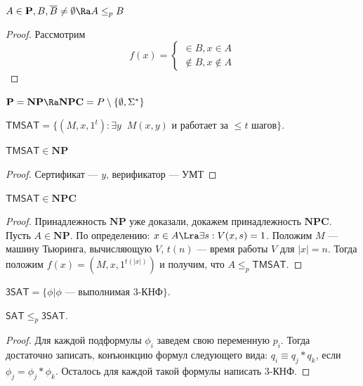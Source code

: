 \begin{proposition}
    \(A \in \mathbf{P}, B, \overline{B} \ne \emptyset \Ra A \le_p B\)
\end{proposition}
\begin{proof}
    Рассмотрим 
    \[f(x) = \left\{\begin{array}{l}
        \in B, x \in A \\
        \notin B, x \notin A
    \end{array}\right.\]
\end{proof}

\begin{corollary}
    \(\mathbf{P} = \mathbf{NP} \Ra \mathbf{NPC} = P \setminus \{\emptyset, \Sigma^*\}\)
\end{corollary}

\begin{definition}
    \(\mathsf{TMSAT} = \{(M, x, 1^t): \exists y\;\;M(x, y)\text{ и работает за }\le t\text{ шагов}\}\).
\end{definition}

\begin{proposition}
    \(\mathsf{TMSAT} \in \mathbf{NP}\)
\end{proposition}
\begin{proof}
    Сертификат --- \(y\), верификатор --- УМТ
\end{proof}

\begin{proposition}
    \(\mathsf{TMSAT} \in \mathbf{NPC}\)
\end{proposition}
\begin{proof}
    Принадлежность \(\mathbf{NP}\) уже доказали, докажем принадлежность \(\mathbf{NPC}\). Пусть \(A \in \mathbf{NP}\). По определению: \(x \in A \Lra \exists s: V(x, s) = 1\). Положим \(M\) --- машину Тьюринга, вычисляющую \(V\), \(t(n)\) --- время работы \(V\) для \(|x| = n\). Тогда положим \(f(x) = (M, x, 1^{t(|x|)})\) и получим, что \(A \le_p \mathsf{TMSAT}\).
\end{proof}


\begin{definition}
    \(\mathsf{3SAT} = \{\phi | \phi \text{ --- выполнимая 3-КНФ}\}\).
\end{definition}

\begin{theorem}
    \(\mathsf{SAT} \le_p \mathsf{3SAT}\).
\end{theorem}
\begin{proof}
   Для каждой подформулы \(\phi_i\) заведем свою переменную \(p_i\). Тогда достаточно записать, конъюнкцию формул следующего вида: \(q_i \equiv q_j * q_k\), если \(\phi_j = \phi_j * \phi_k\). Осталось для каждой такой формулы написать 3-КНФ.
\end{proof}

